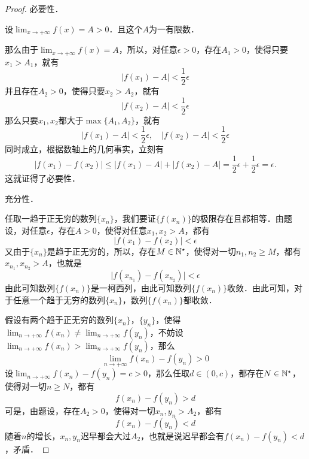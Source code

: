 \begin{proof}
    必要性．

    设$\displaystyle\lim_{x \to +\infty} f(x) = A > 0$．且这个$A$为一有限数．

    那么由于$\displaystyle\lim_{x \to +\infty} f(x) = A$，所以，对任意$\epsilon > 0$，存在$A_1 > 0$，使得只要$x_1 > A_1$，就有
    \begin{equation}
        \lvert f(x_1) - A \rvert < \frac{1}{2} \epsilon
    \end{equation}
    并且存在$A_2 > 0$，使得只要$x_2 > A_2$，就有
    \begin{equation}
        \lvert f(x_2) - A \rvert < \frac{1}{2} \epsilon 
    \end{equation}
    那么只要$x_1, x_2$都大于$\max \{ A_1, A_2 \}$，就有
    \begin{equation}
        \lvert f(x_1) - A \rvert < \frac{1}{2} \epsilon , \quad \lvert f(x_2) - A \rvert < \frac{1}{2} \epsilon 
    \end{equation}
    同时成立，根据数轴上的几何事实，立刻有
    \begin{equation}
        \lvert f(x_1) - f(x_2) \rvert \leq \lvert f(x_1) - A \rvert + \lvert f(x_2) - A \rvert = \frac{1}{2}\epsilon+\frac{1}{2}\epsilon=\epsilon.
    \end{equation}
    这就证得了必要性．

    充分性．

    任取一趋于正无穷的数列$\{ x_n \}$，我们要证$\{ f(x_n) \}$的极限存在且都相等．由题设，对任意$\epsilon$，存在$A>0$，使得对任意$x_1,x_2>A$，都有
    \begin{equation}
        \lvert f(x_1) - f(x_2) \rvert < \epsilon
    \end{equation}
    又由于$\{ x_n \}$是趋于正无穷的，所以，存在$M\in\mathbb{N}^\star$，使得对一切$n_1, n_2 \geq M$，都有$x_{n_1}, x_{n_2} > A$，也就是
    \begin{equation}
        \lvert f(x_{n_1}) - f(x_{n_2}) \rvert < \epsilon
    \end{equation}
    由此可知数列$\{ f(x_n) \}$是一柯西列，由此可知数列$\{ f(x_n) \}$收敛．由此可知，对于任意一个趋于无穷的数列$\{ x_n \}$，数列$\{ f(x_n) \}$都收敛．

    假设有两个趋于正无穷的数列$\{ x_{n} \}$，$\{ y_{n} \}$，使得$\displaystyle\lim_{n \to +\infty} f(x_n) \neq \displaystyle\lim_{n \to +\infty} f(y_n)$，不妨设$\displaystyle\lim_{n\to +\infty}f(x_n)>\displaystyle\lim_{n \to +\infty}f(y_n)$，那么
    \begin{equation}
        \lim_{n \to +\infty} f(x_n) - f(y_n) > 0
    \end{equation}
    设$\displaystyle\lim_{n\to +\infty} f(x_n) - f(y_n) = c > 0$，那么任取$d \in (0, c)$，都存在$N \in \mathbb{N}^\star$，使得对一切$n \geq N$，都有
    \begin{equation}
        f(x_n) - f(y_n) > d
    \end{equation}
    可是，由题设，存在$A_2 > 0$，使得对一切$x_n, y_n > A_2$，都有
    \begin{equation}
        f(x_n) - f(y_n) < d
    \end{equation}
    随着$n$的增长，$x_n, y_n$迟早都会大过$A_2$，也就是说迟早都会有$f(x_n)-f(y_n) < d$，矛盾．


\end{proof}
